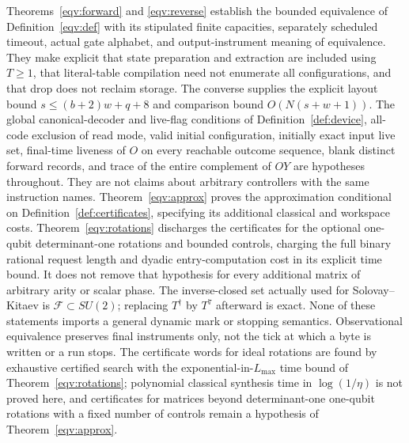 \begin{remark}\label{eqv:status}
Theorems~\ref{eqv:forward} and \ref{eqv:reverse} establish the bounded equivalence of Definition~\ref{eqv:def} with its stipulated finite capacities,
separately scheduled timeout, actual gate alphabet, and output-instrument meaning of
equivalence. They make explicit that state preparation and extraction
are included using $T\geq1$, that literal-table compilation need not
enumerate all configurations, and that drop does not reclaim storage.
The converse supplies the explicit layout bound
$s\leq(b+2)w+q+8$ and comparison bound $O(N(s+w+1))$.
The global canonical-decoder and live-flag conditions of
Definition~\ref{def:device},
all-code exclusion of read mode, valid initial configuration, initially
exact input live set, final-time liveness of $O$ on every reachable
outcome sequence, blank distinct forward records, and trace of the
entire complement of $OY$ are hypotheses throughout. They are not
claims about arbitrary controllers with the same instruction names.
Theorem~\ref{eqv:approx} proves the approximation conditional on Definition~\ref{def:certificates}, specifying its additional classical and
workspace costs. Theorem~\ref{eqv:rotations} discharges the certificates
for the optional one-qubit determinant-one rotations and bounded
controls, charging the full binary rational request length and dyadic
entry-computation cost in its explicit time bound. It does not remove
that hypothesis for every additional
matrix of arbitrary arity or scalar phase. The inverse-closed set
actually used for Solovay--Kitaev is $\mathcal F\subset SU(2)$;
replacing $T^\dagger$ by $T^7$ afterward is exact. None of these
statements imports a general dynamic mark or stopping semantics. Observational equivalence preserves final instruments only, not the tick at which a byte is written or a run stops. The certificate words for ideal rotations are found by exhaustive certified search with the exponential-in-$L_{\max}$ time bound of Theorem~\ref{eqv:rotations}; polynomial classical synthesis time in $\log(1/\eta)$ is not proved here, and certificates for matrices beyond determinant-one one-qubit rotations with a fixed number of controls remain a hypothesis of Theorem~\ref{eqv:approx}.
\end{remark}
